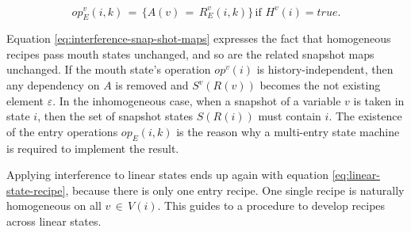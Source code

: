 \documentclass[12pt,a4paper]{scrartcl}
\begin{document}
\begin{equation} \label{eq:entry-operation-implementation}
    op_E^v(i,k) \,=\, \{ A(v) \,=\, R^v_E(i,k) \} \,\mbox{if $H^v(i) = true$}.
\end{equation}

Equation \eqref{eq:interference-snap-shot-maps} expresses the fact that
homogeneous recipes pass mouth states unchanged, and so are the related
snapshot maps unchanged. If the mouth state's operation $op^v(i)$ is 
history-independent, then any dependency on $A$ is removed and $S^v(R(v))$ becomes
the not existing element $\varepsilon$. In the inhomogeneous case, when a snapshot of a
variable $v$ is taken in state $i$, then the set of snapshot states $S(R(i))$
must contain $i$. The existence of the entry operations $op_E(i,k)$ is the
reason why a multi-entry state machine is required to implement the result. 

Applying interference to linear states ends up again with equation
\eqref{eq:linear-state-recipe}, because there is only one entry recipe.  One
single recipe is naturally homogeneous on all $v\,\in\,V(i)$. This guides to a
procedure to develop recipes across linear states.
\end{document}
